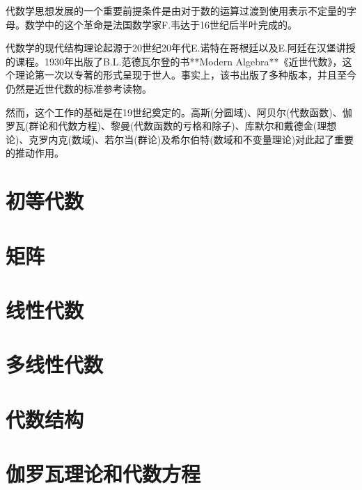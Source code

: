 代数学思想发展的一个重要前提条件是由对于数的运算过渡到使用表示不定量的字母。数学中的这个革命是法国数学家F.韦达于16世纪后半叶完成的。

代数学的现代结构理论起源于20世纪20年代E.诺特在哥根廷以及E.阿廷在汉堡讲授的课程。1930年出版了B.L.范德瓦尔登的书**Modern Algebra**《近世代数》，这个理论第一次以专著的形式呈现于世人。事实上，该书出版了多种版本，并且至今仍然是近世代数的标准参考读物。

然而，这个工作的基础是在19世纪奠定的。高斯(分圆域)、阿贝尔(代数函数)、伽罗瓦(群论和代数方程)、黎曼(代数函数的亏格和除子)、库默尔和戴德金(理想论)、克罗内克(数域)、若尔当(群论)及希尔伯特(数域和不变量理论)对此起了重要的推动作用。
\chapter{初等代数}







\chapter{矩阵}



\chapter{线性代数}





\chapter{多线性代数}





\chapter{代数结构}



\chapter{伽罗瓦理论和代数方程}






